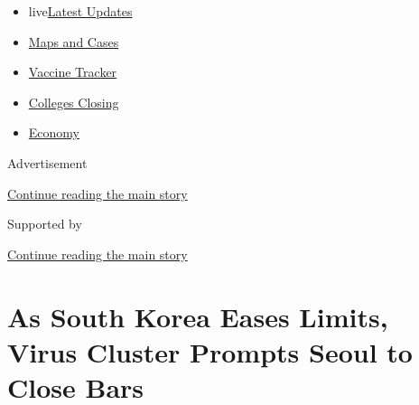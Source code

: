 \begin{itemize}
\tightlist
\item
  live\href{https://www.nytimes3xbfgragh.onion/2020/08/21/world/covid-19-coronavirus.html?name=styln-coronavirus-national\&region=TOP_BANNER\&variant=undefined\&block=storyline_menu_recirc\&action=click\&pgtype=Article\&impression_id=5c719a91-e396-11ea-8c52-fd2265771867}{Latest
  Updates}
\item
  \href{https://www.nytimes3xbfgragh.onion/interactive/2020/us/coronavirus-us-cases.html?name=styln-coronavirus-national\&region=TOP_BANNER\&variant=undefined\&block=storyline_menu_recirc\&action=click\&pgtype=Article\&impression_id=5c719a92-e396-11ea-8c52-fd2265771867}{Maps
  and Cases}
\item
  \href{https://www.nytimes3xbfgragh.onion/interactive/2020/science/coronavirus-vaccine-tracker.html?name=styln-coronavirus-national\&region=TOP_BANNER\&variant=undefined\&block=storyline_menu_recirc\&action=click\&pgtype=Article\&impression_id=5c71c1a0-e396-11ea-8c52-fd2265771867}{Vaccine
  Tracker}
\item
  \href{https://www.nytimes3xbfgragh.onion/2020/08/19/us/colleges-closing-covid.html?name=styln-coronavirus-national\&region=TOP_BANNER\&variant=undefined\&block=storyline_menu_recirc\&action=click\&pgtype=Article\&impression_id=5c71c1a1-e396-11ea-8c52-fd2265771867}{Colleges
  Closing}
\item
  \href{https://www.nytimes3xbfgragh.onion/live/2020/08/20/business/stock-market-today-coronavirus?name=styln-coronavirus-national\&region=TOP_BANNER\&variant=undefined\&block=storyline_menu_recirc\&action=click\&pgtype=Article\&impression_id=5c71c1a2-e396-11ea-8c52-fd2265771867}{Economy}
\end{itemize}

Advertisement

\protect\hyperlink{after-top}{Continue reading the main story}

Supported by

\protect\hyperlink{after-sponsor}{Continue reading the main story}

\hypertarget{as-south-korea-eases-limits-virus-cluster-prompts-seoul-to-close-bars}{%
\section{As South Korea Eases Limits, Virus Cluster Prompts Seoul to
Close
Bars}\label{as-south-korea-eases-limits-virus-cluster-prompts-seoul-to-close-bars}}

